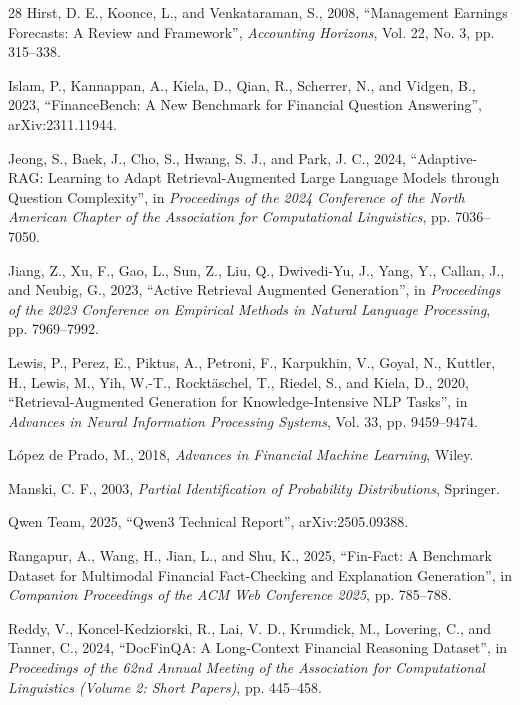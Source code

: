 \begin{thebibliography}{28}
Hirst, D. E., Koonce, L., and Venkataraman, S., 2008, ``Management Earnings Forecasts: A Review and Framework'', \emph{Accounting Horizons}, Vol. 22, No. 3, pp. 315--338.

Islam, P., Kannappan, A., Kiela, D., Qian, R., Scherrer, N., and Vidgen, B., 2023, ``FinanceBench: A New Benchmark for Financial Question Answering'', arXiv:2311.11944.

Jeong, S., Baek, J., Cho, S., Hwang, S. J., and Park, J. C., 2024, ``Adaptive-RAG: Learning to Adapt Retrieval-Augmented Large Language Models through Question Complexity'', in \emph{Proceedings of the 2024 Conference of the North American Chapter of the Association for Computational Linguistics}, pp. 7036--7050.

Jiang, Z., Xu, F., Gao, L., Sun, Z., Liu, Q., Dwivedi-Yu, J., Yang, Y., Callan, J., and Neubig, G., 2023, ``Active Retrieval Augmented Generation'', in \emph{Proceedings of the 2023 Conference on Empirical Methods in Natural Language Processing}, pp. 7969--7992.

Lewis, P., Perez, E., Piktus, A., Petroni, F., Karpukhin, V., Goyal, N., Kuttler, H., Lewis, M., Yih, W.-T., Rockt\"aschel, T., Riedel, S., and Kiela, D., 2020, ``Retrieval-Augmented Generation for Knowledge-Intensive NLP Tasks'', in \emph{Advances in Neural Information Processing Systems}, Vol. 33, pp. 9459--9474.

L\'opez de Prado, M., 2018, \emph{Advances in Financial Machine Learning}, Wiley.

Manski, C. F., 2003, \emph{Partial Identification of Probability Distributions}, Springer.

Qwen Team, 2025, ``Qwen3 Technical Report'', arXiv:2505.09388.

Rangapur, A., Wang, H., Jian, L., and Shu, K., 2025, ``Fin-Fact: A Benchmark Dataset for Multimodal Financial Fact-Checking and Explanation Generation'', in \emph{Companion Proceedings of the ACM Web Conference 2025}, pp. 785--788.

Reddy, V., Koncel-Kedziorski, R., Lai, V. D., Krumdick, M., Lovering, C., and Tanner, C., 2024, ``DocFinQA: A Long-Context Financial Reasoning Dataset'', in \emph{Proceedings of the 62nd Annual Meeting of the Association for Computational Linguistics (Volume 2: Short Papers)}, pp. 445--458.


\end{thebibliography}
